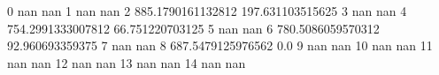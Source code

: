 0 nan nan
1 nan nan
2 885.1790161132812 197.631103515625
3 nan nan
4 754.2991333007812 66.751220703125
5 nan nan
6 780.5086059570312 92.960693359375
7 nan nan
8 687.5479125976562 0.0
9 nan nan
10 nan nan
11 nan nan
12 nan nan
13 nan nan
14 nan nan
